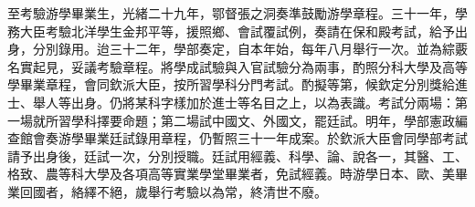 \begin{pinyinscope}
至考驗游學畢業生，光緒二十九年，鄂督張之洞奏準鼓勵游學章程。三十一年，學務大臣考驗北洋學生金邦平等，援照鄉、會試覆試例，奏請在保和殿考試，給予出身，分別錄用。迨三十二年，學部奏定，自本年始，每年八月舉行一次。並為綜覈名實起見，妥議考驗章程。將學成試驗與入官試驗分為兩事，酌照分科大學及高等學畢業章程，會同欽派大臣，按所習學科分門考試。酌擬等第，候欽定分別獎給進士、舉人等出身。仍將某科字樣加於進士等名目之上，以為表識。考試分兩場：第一場就所習學科擇要命題；第二場試中國文、外國文，罷廷試。明年，學部憲政編查館會奏游學畢業廷試錄用章程，仍暫照三十一年成案。於欽派大臣會同學部考試請予出身後，廷試一次，分別授職。廷試用經義、科學、論、說各一，其醫、工、格致、農等科大學及各項高等實業學堂畢業者，免試經義。時游學日本、歐、美畢業回國者，絡繹不絕，歲舉行考驗以為常，終清世不廢。


\end{pinyinscope}